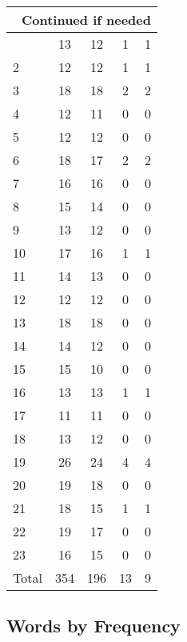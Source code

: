 \begin{center}
\begin{longtable}{l|c|c|c|c}
\hline \multicolumn{5}{|r|}{{Continued if needed}} \\ \hline
\endfoot 
1 & 13 & 12 & 1 & 1\\ \hline
2 & 12 & 12 & 1 & 1\\ \hline
3 & 18 & 18 & 2 & 2\\ \hline
4 & 12 & 11 & 0 & 0\\ \hline
5 & 12 & 12 & 0 & 0\\ \hline
6 & 18 & 17 & 2 & 2\\ \hline
7 & 16 & 16 & 0 & 0\\ \hline
8 & 15 & 14 & 0 & 0\\ \hline
9 & 13 & 12 & 0 & 0\\ \hline
10 & 17 & 16 & 1 & 1\\ \hline
11 & 14 & 13 & 0 & 0\\ \hline
12 & 12 & 12 & 0 & 0\\ \hline
13 & 18 & 18 & 0 & 0\\ \hline
14 & 14 & 12 & 0 & 0\\ \hline
15 & 15 & 10 & 0 & 0\\ \hline
16 & 13 & 13 & 1 & 1\\ \hline
17 & 11 & 11 & 0 & 0\\ \hline
18 & 13 & 12 & 0 & 0\\ \hline
19 & 26 & 24 & 4 & 4\\ \hline
20 & 19 & 18 & 0 & 0\\ \hline
21 & 18 & 15 & 1 & 1\\ \hline
22 & 19 & 17 & 0 & 0\\ \hline
23 & 16 & 15 & 0 & 0\\ \hline
\hline \hline
Total & 354 & 196 & 13 & 9




\end{longtable}
\end{center}



\subsection{Words by Frequency}

